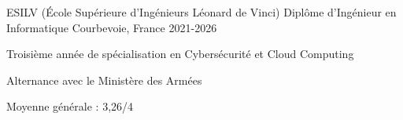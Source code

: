 

\begin{cventries}

	\edentry
	{ESILV (École Supérieure d'Ingénieurs Léonard de Vinci)} %
	{Diplôme d'Ingénieur en Informatique} %
	{Courbevoie, France} %
    {2021-2026}
	{
		\begin{cvitems} %
			\item {Troisième année de spécialisation en Cybersécurité et Cloud Computing}
			\item {Alternance avec le Ministère des Armées}
		\end{cvitems}
	}
	{Moyenne générale : 3,26/4}

\end{cventries}
